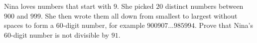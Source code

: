 Nina loves numbers that start with $9$. She picked $20$ distinct numbers between $900$ and $999$. She then wrote them all down from smallest to largest without spaces to form a $60$-digit number, for example $900907 ... 985994$. Prove that Nina's $60$-digit number is not divisible by $91$.
